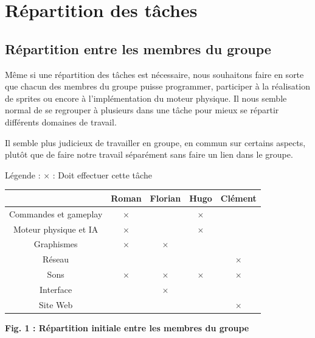 \documentclass{article}
\begin{document}
\newpage
\section{Répartition des tâches}
\subsection{Répartition entre les membres du groupe}

\par
Même si une répartition des tâches est nécessaire, nous souhaitons faire en sorte que chacun des membres du groupe puisse programmer, participer à la réalisation de sprites ou encore à l'implémentation du moteur physique. Il nous semble normal de se regrouper à plusieurs dans une tâche pour mieux se répartir différents domaines de travail.
\newline

\par
Il semble plus judicieux de travailler en groupe, en commun sur certains aspects, plutôt que de faire notre travail séparément sans faire un lien dans le groupe.
\newline

\par
Légende : $\times$ : Doit effectuer cette tâche

\begin{center}
\begin{tabular}{|c|c|c|c|c|}
\hline
 & Roman & Florian & Hugo & Clément \\
\hline
Commandes et gameplay & $\times$ & & $\times$ & \\
\hline
Moteur physique et IA & $\times$ & & $\times$ & \\
\hline
Graphismes & $\times$ & $\times$ & & \\
\hline
Réseau & & & & $\times$ \\
\hline
Sons & $\times$ & $\times$ & $\times$ & $\times$ \\
\hline
Interface & & $\times$ & & \\
\hline
Site Web & & & & $\times$ \\
\hline
\end{tabular}
\end{center}

\begin{center}
\bf{Fig. 1 : Répartition initiale entre les membres du groupe}
\end{center}



\newpage
\end{document}
